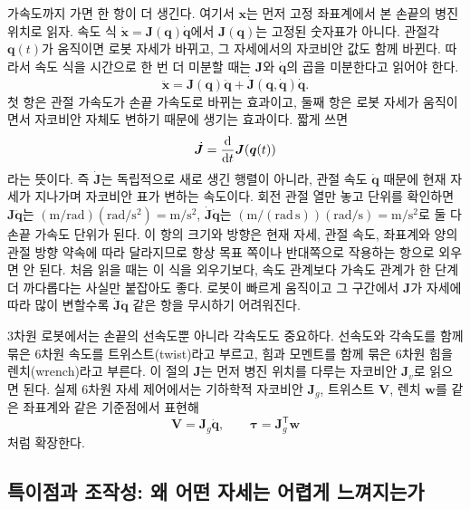가속도까지 가면 한 항이 더 생긴다.
여기서 \(\bm{x}\)는 먼저 고정 좌표계에서 본 손끝의 병진 위치로 읽자.
%
속도 식 \(\dot{\bm{x}}=\bm{J}(\bm{q})\dot{\bm{q}}\)에서 \(\bm{J}(\bm{q})\)는 고정된 숫자표가 아니다.
%
관절각 \(\bm{q}(t)\)가 움직이면 로봇 자세가 바뀌고, 그 자세에서의 자코비안 값도 함께 바뀐다.
따라서 속도 식을 시간으로 한 번 더 미분할 때는 \(\bm{J}\)와 \(\dot{\bm{q}}\)의 곱을 미분한다고 읽어야 한다.
%
\begin{equation}
  \ddot{\bm{x}}
  =
  \bm{J}(\bm{q})\ddot{\bm{q}}
  +
  \dot{\bm{J}}(\bm{q},\dot{\bm{q}})\dot{\bm{q}}.
  \label{eq:jacobian-acceleration-foundation}
\end{equation}
첫 항은 관절 가속도가 손끝 가속도로 바뀌는 효과이고, 둘째 항은 로봇 자세가 움직이면서 자코비안 자체도 변하기 때문에 생기는 효과이다.
짧게 쓰면
\[
  \dot{\bm{J}}
  =
  \frac{\dd}{\dd t}\bm{J}(\bm{q}(t))
\vmark{accel-jdot-definition}%
\]
라는 뜻이다.
즉 \(\dot{\bm{J}}\)는 독립적으로 새로 생긴 행렬이 아니라, 관절 속도 \(\dot{\bm{q}}\) 때문에 현재 자세가 지나가며 자코비안 표가 변하는 속도이다.
%
회전 관절 열만 놓고 단위를 확인하면 \(\bm{J}\ddot{\bm{q}}\)는 \((\mathrm{m/rad})(\mathrm{rad/s^2})=\mathrm{m/s^2}\), \(\dot{\bm{J}}\dot{\bm{q}}\)는 \((\mathrm{m/(rad\,s)})(\mathrm{rad/s})=\mathrm{m/s^2}\)로 둘 다 손끝 가속도 단위가 된다.
%
이 항의 크기와 방향은 현재 자세, 관절 속도, 좌표계와 양의 관절 방향 약속에 따라 달라지므로 항상 목표 쪽이나 반대쪽으로 작용하는 항으로 외우면 안 된다.
%
처음 읽을 때는 이 식을 외우기보다, 속도 관계보다 가속도 관계가 한 단계 더 까다롭다는 사실만 붙잡아도 좋다.
로봇이 빠르게 움직이고 그 구간에서 \(\bm{J}\)가 자세에 따라 많이 변할수록 \(\dot{\bm{J}}\dot{\bm{q}}\) 같은 항을 무시하기 어려워진다.

3차원 로봇에서는 손끝의 선속도뿐 아니라 각속도도 중요하다.
선속도와 각속도를 함께 묶은 6차원 속도를 트위스트(twist)라고 부르고, 힘과 모멘트를 함께 묶은 6차원 힘을 렌치(wrench)라고 부른다.
이 절의 \(\bm{J}\)는 먼저 병진 위치를 다루는 자코비안 \(\bm{J}_v\)로 읽으면 된다.
실제 6차원 자세 제어에서는 기하학적 자코비안 \(\bm{J}_g\), 트위스트 \(\bm{V}\), 렌치 \(\bm{w}\)를 같은 좌표계와 같은 기준점에서 표현해
\[
  \bm{V}=\bm{J}_g\dot{\bm{q}},
  \qquad
  \bm{\tau}=\bm{J}_g^{\mathsf{T}}\bm{w}
\]
처럼 확장한다.

\subsection{특이점과 조작성: 왜 어떤 자세는 어렵게 느껴지는가}
\label{sec:robotics-singularity-conditioning}

